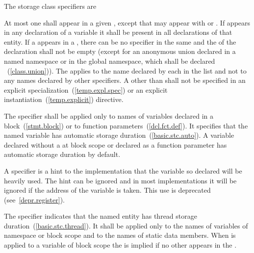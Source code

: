 \pnum
The storage class specifiers are

\begin{bnf}
\br
    \br
    \br
    \br
    \br
\end{bnf}

At most one  shall appear in a given
, except that  may appear with  or 
. If  appears in any declaration of
a variable it shall be present in all declarations of that entity. If a 
appears in a , there can be no
 specifier in the same  and
the  of the declaration shall not be
empty (except for an anonymous union declared in a named namespace or in the
global namespace, which shall be declared
%
~(\ref{class.union})). The
 applies to the name declared by each
 in the list and not to any names declared by
other specifiers. A 
other than 
shall not be
specified in an explicit specialization~(\ref{temp.expl.spec}) or an
explicit instantiation~(\ref{temp.explicit}) directive.

\pnum
{}%
The  specifier shall be applied only to names of variables
declared in a block~(\ref{stmt.block}) or to function
parameters~(\ref{dcl.fct.def}). It specifies that the named variable has
automatic storage duration~(\ref{basic.stc.auto}). A variable declared
without a  at block scope or declared
as a function parameter has automatic storage duration by default.

\pnum
{}%
A  specifier is a hint to the implementation that the
variable so declared will be heavily used.
\enternote
The hint can be ignored and in most implementations it will be ignored
if the address of the variable is taken. This use is deprecated (see~\ref{depr.register}).
\exitnote

\pnum
The  specifier
indicates that the named entity has thread storage duration~(\ref{basic.stc.thread}). It
shall be applied only
to the names of variables of namespace
or block scope and to the names of static data members.
When  is applied to a variable of block scope the
  is implied if no other
 appears in the
.

